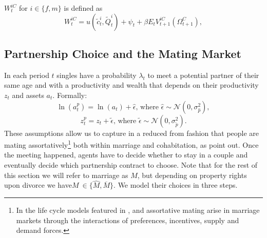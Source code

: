 \documentclass[12pt]{article}
\numberwithin{table}{section}
\begin{document}
$W_{t}^{iC}$ for $i\in\{f,m\}$ is defined as 
\begin{equation}
W_{t}^{iC}=u(\tilde{c}_t^{i},\tilde{Q}_t^{i})+\psi_t+\beta E_t V_{t+1}^{iC}(\Omega^{C}_{t+1}),
\end{equation}
\subsection{Partnership Choice and the Mating Market}\label{ssec:marriage_market}
In each period $t$ singles have a probability $\lambda_t$ to meet a potential partner of their same age and with a productivity and wealth that depends on their productivity $z_t$ and assets $a_{t}$. Formally:
\begin{equation}\label{mma}
\ln(a^p_t)=\ln(a_{t})+\hat{\epsilon}\text{, where }\hat{\epsilon}\sim\mathcal{N}(0,\sigma^2_{\hat{p}}),
\end{equation}
\begin{equation}\label{mmz}
z^p_t=z_{t}+\tilde{\epsilon}\text{, where }\tilde{\epsilon}\sim\mathcal{N}(0,\sigma^2_{\tilde{p}}).
\end{equation}
These assumptions allow us to capture in a reduced from fashion that people are mating assortatively\footnote{In the life cycle models featured in \cite{ciscato2019}, \cite{shephard2019} and \cite{reynoso2019} assortative mating arise in marriage markets through the interactions of preferences, incentives, supply and demand forces.} both within marriage and cohabitation, as \cite{gemici2014} point out.
Once the meeting happened, agents have to decide whether to stay in a couple and eventually decide which partnership contract to choose. Note that for the rest of this section we will refer to marriage as $M$, but depending on property rights upon divorce we have$M \ \in\{\hat{M},\overline{M}\}$. We model their choices in three steps. 
\end{document}
